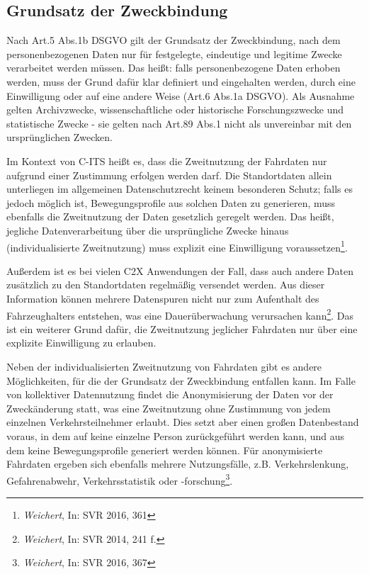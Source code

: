 \subsection{Grundsatz der Zweckbindung}

Nach Art.5 Abs.1b DSGVO gilt der Grundsatz der Zweckbindung, nach dem personenbezogenen Daten nur für festgelegte, eindeutige und legitime Zwecke verarbeitet werden müssen. Das heißt: falls personenbezogene Daten erhoben werden, muss der Grund dafür klar definiert und eingehalten werden, durch eine Einwilligung oder auf eine andere Weise (Art.6 Abs.1a DSGVO). Als Ausnahme gelten Archivzwecke, wissenschaftliche oder historische Forschungszwecke und statistische Zwecke - sie gelten nach Art.89 Abs.1 nicht als unvereinbar mit den ursprünglichen Zwecken. 

Im Kontext von C-ITS heißt es, dass die Zweitnutzung der Fahrdaten nur aufgrund einer Zustimmung erfolgen werden darf. Die Standortdaten allein unterliegen im allgemeinen Datenschutzrecht keinem besonderen Schutz; falls es jedoch möglich ist, Bewegungsprofile aus solchen Daten zu generieren, muss ebenfalls die Zweitnutzung der Daten gesetzlich geregelt werden. Das heißt, jegliche Datenverarbeitung über die ursprüngliche Zwecke hinaus (individualisierte Zweitnutzung) muss explizit eine Einwilligung voraussetzen\footnote{\emph{Weichert}, In: SVR 2016, 361}.

Außerdem ist es bei vielen C2X Anwendungen der Fall, dass auch andere Daten zusätzlich zu den Standortdaten regelmäßig versendet werden. Aus dieser Information können mehrere Datenspuren nicht nur zum Aufenthalt des Fahrzeughalters entstehen, was eine Dauerüberwachung verursachen kann\footnote{\emph{Weichert}, In: SVR 2014, 241 f.}. Das ist ein weiterer Grund dafür, die Zweitnutzung jeglicher Fahrdaten nur über eine explizite Einwilligung zu erlauben. 

Neben der individualisierten Zweitnutzung von Fahrdaten gibt es andere Möglichkeiten, für die der Grundsatz der Zweckbindung entfallen kann. Im Falle von kollektiver Datennutzung findet die Anonymisierung der Daten vor der Zweckänderung statt, was eine Zweitnutzung ohne Zustimmung von jedem einzelnen Verkehrsteilnehmer erlaubt. Dies setzt aber einen großen Datenbestand voraus, in dem auf keine einzelne Person zurückgeführt werden kann, und aus dem keine Bewegungsprofile generiert werden können. Für anonymisierte Fahrdaten ergeben sich ebenfalls mehrere Nutzungsfälle, z.B. Verkehrslenkung, Gefahrenabwehr, Verkehrsstatistik oder -forschung\footnote{\emph{Weichert}, In: SVR 2016, 367}.

